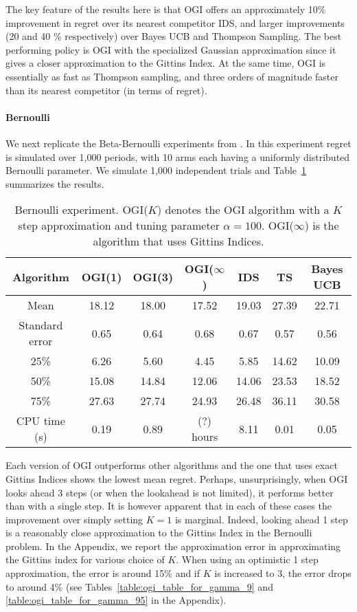 The key feature of the results here is that OGI offers an approximately 10\% improvement in regret over its nearest competitor IDS, and larger improvements (20 and 40 \% respectively) over Bayes UCB and Thompson Sampling. The best performing policy is OGI with the specialized Gaussian approximation since it gives a closer approximation to the Gittins Index. At the same time, OGI is essentially as fast as Thompson sampling, and three orders of magnitude faster than its nearest competitor (in terms of regret). 


\paragraph{Bernoulli}
We next replicate the Beta-Bernoulli experiments from \cite{russo2014learning}.
In this experiment regret is simulated over 1,000 periods, with 10 arms each having a uniformly distributed Bernoulli parameter. We simulate 1,000 independent trials and Table~\ref{table:bernoulli_experiment1} summarizes the results.

\begin{table}[h!]
	\centering
	\begin{tabular}{ccccccc} \toprule
		\textbf{Algorithm} & \textbf{OGI(1)} & \textbf{OGI(3)} &  \textbf{OGI($\infty$)} & \textbf{IDS} & \textbf{TS} & \textbf{Bayes UCB}  \\ \midrule
		Mean &  18.12 & 18.00 & 17.52 & 19.03 & 27.39 & 22.71 \\ 
		Standard error & 0.65 & 0.64 &  0.68 & 0.67 & 0.57 & 0.56 \\ 
		25\% & 6.26 & 5.60 & 4.45 & 5.85 & 14.62 & 10.09 \\
		50\% & 15.08 & 14.84 &12.06 & 14.06 & 23.53 & 18.52 \\
		75\% & 27.63 & 27.74 & 24.93 & 26.48 & 36.11 & 30.58 \\
		CPU time (s) & 0.19 & 0.89 & (?) hours & 8.11 & 0.01 & 0.05  \\ \bottomrule
	\end{tabular}
	\caption[Table caption text]{Bernoulli experiment. OGI($K$) denotes the OGI algorithm with a $K$ step approximation and tuning parameter $\alpha = 100$. OGI($\infty$) is the algorithm that uses Gittins Indices.}
	\label{table:bernoulli_experiment1}
\end{table}
Each version of OGI outperforms other algorithms and the one that uses exact Gittins Indices shows the lowest mean regret.
Perhaps, unsurprisingly, when OGI  looks ahead 3 steps (or when the lookahead is not limited), it performs better than with a single step. It is however apparent that in each of these cases the improvement over simply setting $K=1$ is marginal. Indeed, looking ahead 1 step is a reasonably close approximation to the Gittins Index in the Bernoulli problem. In the Appendix, we report the approximation error in approximating the Gittins index for various choice of $K$. When using an optimistic 1 step approximation, the error is around 15\% and if $K$ is increased to 3, the error drops to around 4\% (see Tables~\ref{table:ogi_table_for_gamma_9} and \ref{table:ogi_table_for_gamma_95} in the Appendix). 

